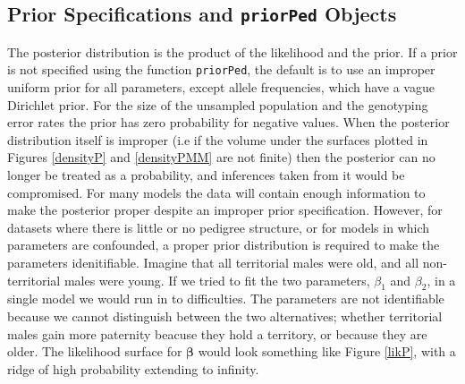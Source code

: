 \documentclass{article}
\begin{document}
\subsection{Prior Specifications and \texttt{priorPed} Objects}
\label{prior-sec}

The posterior distribution is the product of the likelihood and the prior. If a prior is not specified using the function \texttt{priorPed}, the default is to use an improper uniform prior for all parameters, except allele frequencies, which have a vague Dirichlet prior. For the size of the unsampled population and the genotyping error rates the prior has zero probability for negative values.  When the posterior distribution itself is improper (i.e if the volume under the surfaces plotted in Figures \ref{densityP} and \ref{densityPMM} are not finite) then the posterior can no longer be treated as a probability, and inferences taken from it would be compromised.  For many models the data will contain enough information to make the posterior proper despite an improper prior specification. However, for datasets where there is little or no pedigree structure, or for models in which parameters are confounded, a proper prior distribution is required to make the parameters idenitifiable.  Imagine that all territorial males were old, and all non-territorial males were young. If we tried to fit the two parameters, $\beta_{1}$ and $\beta_{2}$, in a single model we would run in to difficulties.  The parameters are not identifiable because we cannot distinguish between the two alternatives; whether territorial males gain more paternity beacuse they hold a territory, or because they are older.  The likelihood surface for $\bm{\beta}$ would look something like Figure \ref{likP}, with a ridge of high probability extending to infinity.\\  
\end{document}
